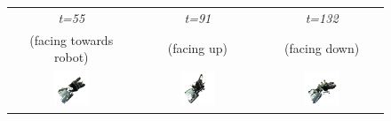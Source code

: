 \begin{figure}
\centering
\begin{tabular}{c:c:c}
\textit{t=55} & \textit{t=91} & \textit{t=132} \\
(facing towards robot) & (facing up) & (facing down)\\
\includegraphics[width=0.3\textwidth]{images/eval_vicon/sequence/arm_movement/obs_55.png} & \includegraphics[width=0.3\textwidth]{images/eval_vicon/sequence/arm_movement/obs_91.png} & \includegraphics[width=0.3\textwidth]{images/eval_vicon/sequence/arm_movement/obs_132.png} \\

\end{tabular}
\end{figure}
